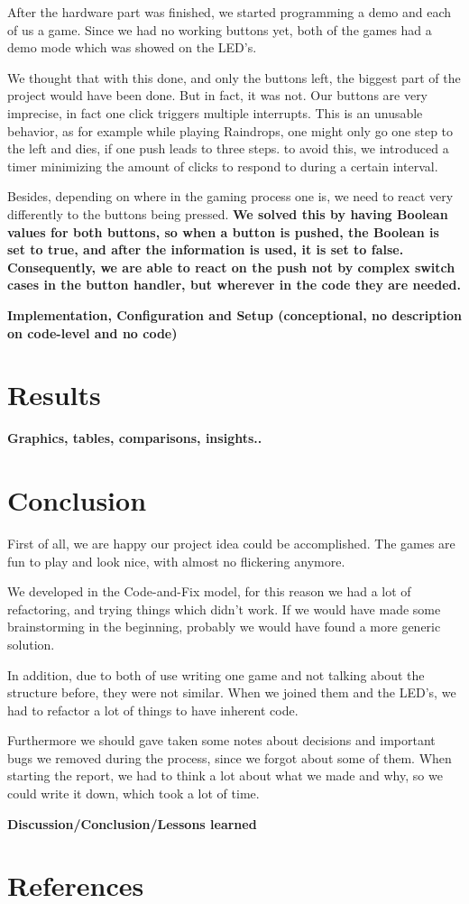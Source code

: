 \documentclass[a4paper,12pt]{article}
\begin{document}
After the hardware part was finished, we started programming a demo and each of us a game.
 Since we had no working buttons yet, both of the games had a demo mode which was showed on the LED's.

We thought that with this done, and only the buttons left, the biggest part of the project would have been done.
 But in fact, it was not.
 Our buttons are very imprecise, in fact one click triggers multiple interrupts.
 This is an unusable behavior, as for example while playing Raindrops, one might only go one step to the left and dies, if one push leads to three steps.
 to avoid this, we introduced a timer minimizing the amount of clicks to respond to during a certain interval.
 
 Besides, depending on where in the gaming process one is, we need to react very differently to the buttons being pressed.
 \textbf{We solved this by having Boolean values for both buttons, so when a button is pushed, the Boolean is set to true, and after the information is used, it is set to false.
 Consequently, we are able to react on the push not by complex switch cases in the button handler, but wherever in the code they are needed.}
 
 
 
\textbf{Implementation, Configuration and Setup (conceptional, no description
on code-level and no code)}

\section{Results}
\textbf{Graphics, tables, comparisons, insights..}

\section{Conclusion}
First of all, we are happy our project idea could be accomplished.
 The games are fun to play and look nice, with almost no flickering anymore.

We developed in the Code-and-Fix model, for this reason we had a lot of refactoring, and trying things which didn't work.
 If we would have made some brainstorming in the beginning, probably we would have found a more generic solution.
 
 In addition, due to both of use writing one game and not talking about the structure before, they were not similar.
 When we joined them and the LED's, we had to refactor a lot of things to have inherent code.

Furthermore we should gave taken some notes about decisions and important bugs we removed during the process, since we forgot about some of them.
 When starting the report, we had to think a lot about what we made and why, so we could write it down, which took a lot of time.

\textbf{Discussion/Conclusion/Lessons learned}

\section{References}
\end{document}
